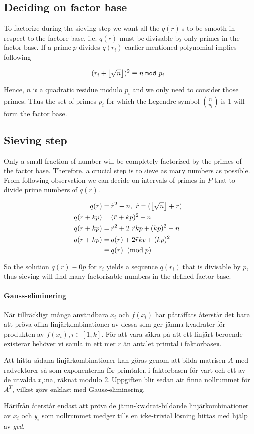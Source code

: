 \subsection{Deciding on factor base}
To factorize during the sieving step we want all the $q(r)$'s to be smooth in respect
to the factore base, i.e. $q(r)$ must be divisable by only primes in the factor base.
If a prime $p$ divides $q(r_i)$ earlier mentioned polynomial implies following

\begin{equation}
(r_i + \myfloor{\sqrt{n}})^2 \equiv n \ \texttt{mod} \ p_i
\end{equation}

Hence, $n$ is a quadratic residue modulo $p_i$ and we only need to consider those primes. Thus the set of primes $p_i$ for which the Legendre symbol $(\frac{n}{p_i})$ is 1 will form the factor base.


\subsection{Sieving step}
Only a small fraction of number will be completely factorized by the primes of
the factor base. Therefore, a crucial step is to sieve as many numbers as possible.
From following observation we can decide on intervals of primes in $P$ that
to divide prime numbers of $q(r)$.

\begin{align}
q(r) &= \tilde{r}^2 - n, \ \tilde{r} = (\myfloor{\sqrt{n}} + r) \\
q(r+kp) &= (\tilde{r}+kp)^2-n \\
q(r+kp) &= \tilde{r}^2 + 2 \ \tilde{r}kp + (kp)^2 - n \\
q(r+kp) &= q(r) + 2\tilde{r}kp + (kp)^2 \\
		&\equiv q(r) \imod{p}
\end{align}

So the solution $q(r) \equiv 0 {p}$ for $r_i$ yields a sequence $q(r_i)$ 
that is divisable by $p$, thus sieving will find many factorizable numbers
in the defined factor base.

\paragraph{Gauss-eliminering}

När tillräckligt många användbara $x_i$ och $f(x_i)$ har påträffats återstår det
bara att pröva olika linjärkombinationer av dessa som ger jämna kvadrater för
produkten av $f(x_i), i \in [1,k]$. För att vara säkra på att ett linjärt
beroende existerar behöver vi samla in ett mer $r$ än antalet primtal i
faktorbasen. 

Att hitta sådana linjärkombinationer kan göras genom att bilda matrisen $A$ med
radvektorer så som exponenterna för primtalen i faktorbasen för vart och ett av
de utvalda $x_i$:na, räknat modulo 2. Uppgiften blir sedan att finna nollrummet
för $A^T$, vilket görs enklast med Gauss-eliminering.

Härifrån återstår endast att pröva de jämn-kvadrat-bildande linjärkombinationer
av $x_i$ och $y_i$ som nollrummet medger tills en icke-trivial lösning hittas
med hjälp av \emph{gcd}.
